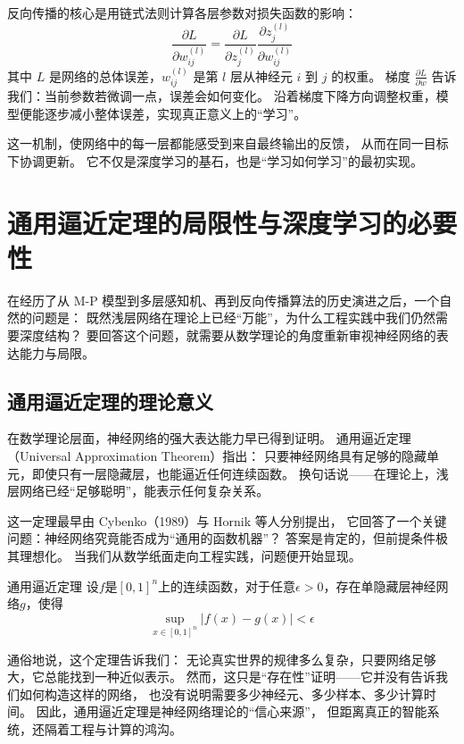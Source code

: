 反向传播的核心是用链式法则计算各层参数对损失函数的影响：  
\begin{equation}
\frac{\partial L}{\partial w_{ij}^{(l)}} = \frac{\partial L}{\partial z_j^{(l)}} \frac{\partial z_j^{(l)}}{\partial w_{ij}^{(l)}}
\end{equation}
其中 $L$ 是网络的总体误差，$w_{ij}^{(l)}$ 是第 $l$ 层从神经元 $i$ 到 $j$ 的权重。  
梯度 $\frac{\partial L}{\partial w}$ 告诉我们：当前参数若微调一点，误差会如何变化。  
沿着梯度下降方向调整权重，模型便能逐步减小整体误差，实现真正意义上的“学习”。  

这一机制，使网络中的每一层都能感受到来自最终输出的反馈，  
从而在同一目标下协调更新。  
它不仅是深度学习的基石，也是“学习如何学习”的最初实现。

\section{通用逼近定理的局限性与深度学习的必要性}

在经历了从 M-P 模型到多层感知机、再到反向传播算法的历史演进之后，一个自然的问题是：  
既然浅层网络在理论上已经“万能”，为什么工程实践中我们仍然需要深度结构？  
要回答这个问题，就需要从数学理论的角度重新审视神经网络的表达能力与局限。

\subsection{通用逼近定理的理论意义}

在数学理论层面，神经网络的强大表达能力早已得到证明。  
通用逼近定理（Universal Approximation Theorem）指出：  
只要神经网络具有足够的隐藏单元，即使只有一层隐藏层，也能逼近任何连续函数。  
换句话说——在理论上，浅层网络已经“足够聪明”，能表示任何复杂关系。  

这一定理最早由 Cybenko（1989）与 Hornik 等人分别提出，  
它回答了一个关键问题：神经网络究竟能否成为“通用的函数机器”？  
答案是肯定的，但前提条件极其理想化。  
当我们从数学纸面走向工程实践，问题便开始显现。

\begin{theorem}[]{通用逼近定理}
设$f$是$[0,1]^n$上的连续函数，对于任意$\epsilon > 0$，存在单隐藏层神经网络$g$，使得
$$\sup_{x \in [0,1]^n} |f(x) - g(x)| < \epsilon$$
\end{theorem}

通俗地说，这个定理告诉我们：  
无论真实世界的规律多么复杂，只要网络足够大，它总能找到一种近似表示。  
然而，这只是“存在性”证明——它并没有告诉我们如何构造这样的网络，  
也没有说明需要多少神经元、多少样本、多少计算时间。  
因此，通用逼近定理是神经网络理论的“信心来源”，  
但距离真正的智能系统，还隔着工程与计算的鸿沟。

